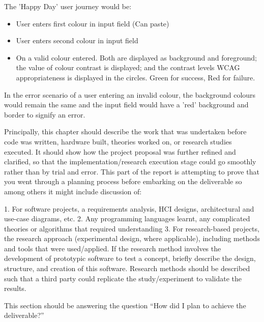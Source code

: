 The 'Happy Day' user journey would be:
\begin{itemize}
\item User enters first colour in input field (Can paste)
\item User enters second colour in input field
\item On a valid colour entered. Both are displayed as background and
foreground; the value of colour contrast is displayed; and the contrast
levels WCAG appropriateness is displayed in the circles. Green for success, Red
for failure.
\end{itemize}

In the error scenario of a user entering an invalid colour, the background
colours would remain the same and the input field would have a 'red'
background and border to signify an error.




Principally, this chapter should describe the work that was undertaken before
code was written, hardware built, theories worked on, or research studies
executed. It should show how the project proposal was further refined and
clarified, so that the implementation/research execution stage could go
smoothly rather than by trial and error. This part of the report is attempting to
prove that you went through a planning process before embarking on the
deliverable so among others it might include discussion of:

1. For software projects, a requirements analysis, HCI designs, architectural
and use-case diagrams, etc.
2. Any programming languages learnt, any complicated theories or algorithms
that required understanding
3. For research-based projects, the research approach (experimental design,
where applicable), including methods and tools that were used/applied. If the
research method involves the development of prototypic software to test a
concept, briefly describe the design, structure, and creation of this software.
Research methods should be described such that a third party could replicate
the study/experiment to validate the results.

This section should be answering the question “How did I plan to achieve the
deliverable?”
